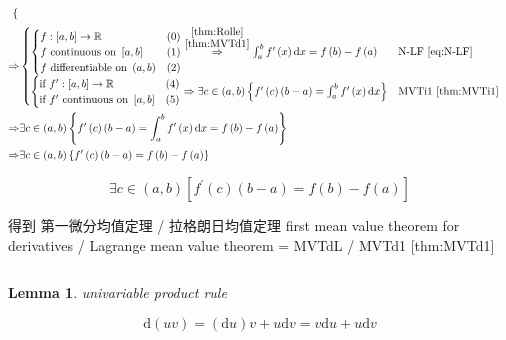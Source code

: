\documentclass[
]{book}
\newtheorem{lemma}{Lemma}[chapter]
\theoremstyle{definition}
\theoremstyle{definition}
\theoremstyle{definition}
\theoremstyle{definition}
\theoremstyle{remark}
\begin{document}
\[\begin{aligned}
\begin{cases}
\end{cases}\\
\Rightarrow & \begin{cases}
\begin{cases}
f:\left[a,b\right]\rightarrow\mathbb{R} & \left(0\right)\\
f\text{ continuous on }\left[a,b\right] & \left(1\right)\\
f\text{ differentiable on }\left(a,b\right) & \left(2\right)
\end{cases}\overset{\stackrel{\ref{thm:Rolle}}{\ref{thm:MVTd1}}}{\Rightarrow}\int_{a}^{b}f^{\prime}\left(x\right)\mathrm{d}x=f\left(b\right)-f\left(a\right) & \text{N-LF }\ref{eq:N-LF}\\
\begin{cases}
\text{if }f^{\prime}:\left[a,b\right]\rightarrow\mathbb{R} & \left(4\right)\\
\text{if }f^{\prime}\text{ continuous on }\left[a,b\right] & \left(5\right)
\end{cases}\Rightarrow\exists c\in\left(a,b\right)\left\{ f^{\prime}\left(c\right)\left(b-a\right)=\int_{a}^{b}f^{\prime}\left(x\right)\mathrm{d}x\right\}  & \text{MVTi1 }\ref{thm:MVTi1}
\end{cases}\\
\Rightarrow & \exists c\in\left(a,b\right)\left\{ f^{\prime}\left(c\right)\left(b-a\right)=\int_{a}^{b}f^{\prime}\left(x\right)\mathrm{d}x=f\left(b\right)-f\left(a\right)\right\} \\
\Rightarrow & \exists c\in\left(a,b\right)\left\{ f^{\prime}\left(c\right)\left(b-a\right)=f\left(b\right)-f\left(a\right)\right\} 
\end{aligned}
\]

\[
\exists c\in\left(a,b\right)\left[f^{\prime}\left(c\right)\left(b-a\right)=f\left(b\right)-f\left(a\right)\right]
\]

\begin{CJK}{UTF8}{bsmi}
得到 第一微分均值定理 / 拉格朗日均值定理 first mean value theorem for derivatives / Lagrange mean value theorem = MVTdL / MVTd1 [thm:MVTd1]
\end{CJK}

\[
\tag*{$\Box$}
\]

\begin{lemma}
\protect\hypertarget{lem:unnamed-chunk-2}{}\label{lem:unnamed-chunk-2}univariable product rule
\end{lemma}

\[
\mathrm{d}\left(uv\right)=\left(\mathrm{d}u\right)v+u\mathrm{d}v=v\mathrm{d}u+u\mathrm{d}v
\]
\end{document}

